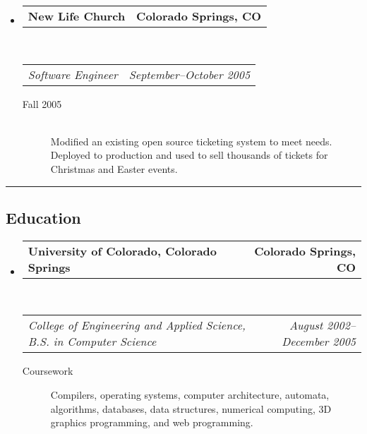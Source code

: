 \documentclass[10pt,letterpaper]{article}
\makeatletter
\newcommand{\headerrow}[2]
{\begin{tabular*}{\linewidth}{l@{\extracolsep{\fill}}r}
  #1 &
  #2 \\
\end{tabular*}}
\makeatother
\begin{document}
\begin{itemize}

  \item
  \headerrow
    {\textbf{New Life Church}}
    {\textbf{Colorado Springs, CO}}
  \\
  \headerrow
    {\emph{Software Engineer}}
    {\emph{September--October 2005}}
  \begin{description}
    \item[Fall 2005] \hfill \\
        Modified an existing open source ticketing system to meet needs. \\
        Deployed to production and used to sell thousands of tickets for Christmas and Easter events.
  \end{description}

\end{itemize}


\hrule
\vspace{-0.4em}
\subsection*{Education}

\begin{itemize}
  \parskip=0.1em

  \item
  \headerrow
    {\textbf{University of Colorado, Colorado Springs}}
    {\textbf{Colorado Springs, CO}}
  \\
  \headerrow
    {\emph{College of Engineering and Applied Science, B.S. in Computer Science}}
    {\emph{August 2002--December 2005}}
  \begin{description}
    \item[Coursework] Compilers, operating systems, computer architecture, automata, algorithms, databases, data structures, numerical computing, 3D graphics programming, and web programming.
  \end{description}

\end{itemize}
\end{document}
